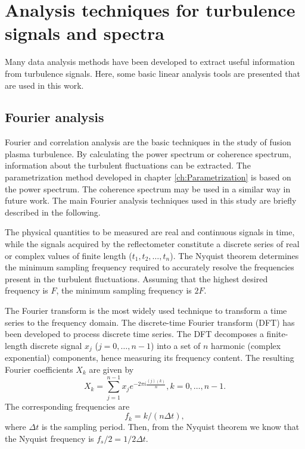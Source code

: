 
\chapter{Analysis techniques for turbulence signals and spectra} \label{appA}
\graphicspath{{AppendixA_ys/}}


Many data analysis methods have been developed to extract useful information from turbulence signals. Here, some basic linear analysis tools are presented that are used in this work.

\section{Fourier analysis}

Fourier and correlation analysis are the basic techniques in the study of fusion plasma turbulence. By calculating the power spectrum or coherence spectrum, information about the turbulent fluctuations can be extracted. The parametrization method developed in chapter \ref{ch:Parametrization} is based on the power spectrum. The coherence spectrum may be used in a similar way in future work. The main Fourier analysis techniques used in this study are briefly described in the following.

The physical quantities to be measured are real and continuous signals in time, while the signals acquired by the reflectometer constitute a discrete series of real or complex values of finite length ($t_1, t_2, \ldots, t_n$). The Nyquist theorem determines the minimum sampling frequency required to accurately resolve the frequencies present in the turbulent fluctuations. Assuming that the highest desired frequency is $F$, the minimum sampling frequency is $2F$.

The Fourier transform is the most widely used technique to transform a time series to the frequency domain. The discrete-time Fourier transform (DFT) has been developed to process discrete time series. The DFT decomposes a finite-length discrete signal $x_j$ ($j=0,\ldots, n-1$) into a set of $n$ harmonic (complex exponential) components, hence measuring its frequency content. The resulting Fourier coefficients $X_k$ are given by %
\begin{equation}
  X_k = \sum_{j=1}^{n-1}x_je^{-2\pi{i}\frac{(j)(k)}{n}}, k=0,\dots, n-1.
\end{equation}
\noindent The corresponding frequencies are %
\begin{equation}
  f_k = k/(n\Delta{t}),
\end{equation}
\noindent where $\Delta{t}$ is the sampling period. Then, from the Nyquist theorem we know that the Nyquist frequency is $f_s/2=1/2\Delta{t}$.

